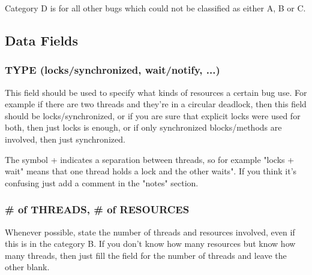 Category D is for all other bugs which could not be classified as either A, B or C.

\subsection{Data Fields}

\subsubsection{TYPE (locks/synchronized, wait/notify, ...)}

This field should be used to specify what kinds of resources a certain bug use. For example if there are two threads and they're in a circular deadlock, then this field should be locks/synchronized, or if you are sure that explicit locks were used for both, then just locks is enough, or if only synchronized blocks/methods are involved, then just synchronized.

The symbol + indicates a separation between threads, so for example "locks + wait" means that one thread holds a lock and the other waits". If you think it's confusing just add a comment in the "notes" section.

\subsubsection{\# of THREADS, \# of RESOURCES}

Whenever possible, state the number of threads and resources involved, even if this is in the category B. If you don't know how many resources but know how many threads, then just fill the field for the number of threads and leave the other blank.
